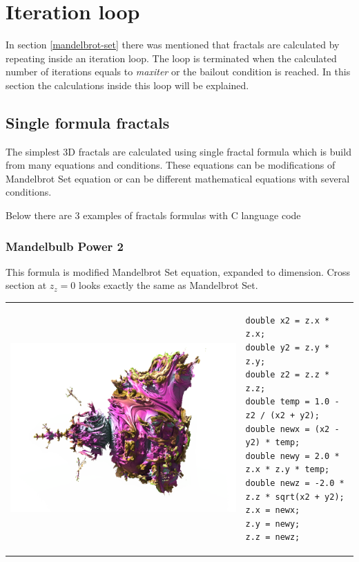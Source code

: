 \section{Iteration loop}\label{iteration-loop}

In section \ref{mandelbrot-set} there was mentioned that fractals are calculated
by repeating inside an iteration loop. The loop is terminated when the calculated
number of iterations equals to \emph{maxiter} or the bailout condition is reached.
In this section the calculations inside this loop will be explained.

\subsection{Single formula fractals}\label{single-formula-fractals}

The simplest 3D fractals are calculated using single fractal formula which is
build from many equations and conditions. These equations can be modifications
of Mandelbrot Set equation or can be different mathematical equations with
several conditions.

Below there are 3 examples of fractals formulas with C language code

\subsubsection{Mandelbulb Power 2} \nopagebreak

This formula is modified Mandelbrot Set equation, expanded to  dimension.
Cross section at $ z_z = 0 $ looks exactly the same as Mandelbrot Set.
\nopagebreak

\begin{tabular}{l l}
	\includegraphics[width=0.3\linewidth]{img/manual/media/formula_mandelbulb_power_2}	
	& 
	\begin{minipage}[b]{0.5\linewidth}
	    \begin{lstlisting}
double x2 = z.x * z.x;
double y2 = z.y * z.y;
double z2 = z.z * z.z;
double temp = 1.0 - z2 / (x2 + y2);
double newx = (x2 - y2) * temp;
double newy = 2.0 * z.x * z.y * temp;
double newz = -2.0 * z.z * sqrt(x2 + y2);
z.x = newx;
z.y = newy;
z.z = newz;
        \end{lstlisting}
	\end{minipage}
\end{tabular} 


